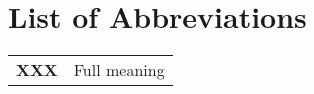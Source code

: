 \chapter*{ \textbf{\Large \sc List of Abbreviations}}
\vspace{50pt}




\begin{table}[h] \centering
\begin{adjustbox}{max width=\textwidth}
\begin{tabular}{ll}	
\textbf{XXX}&Full meaning  \\	
		
\end{tabular}
\end{adjustbox}
\end{table}	

									
						

